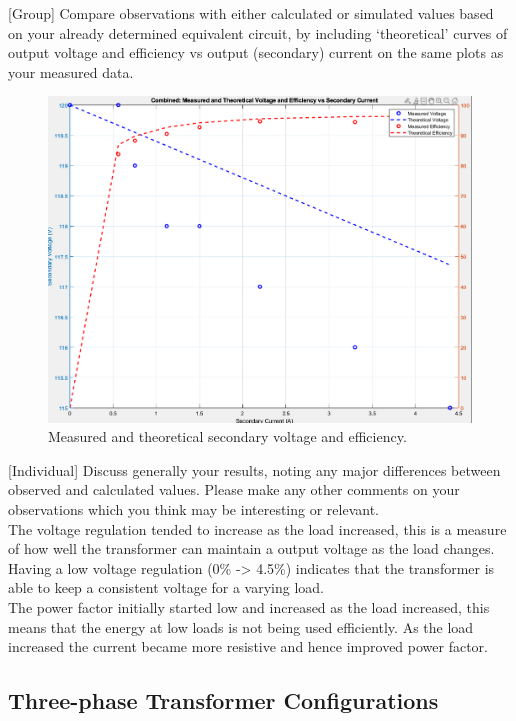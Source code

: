 \documentclass[11pt]{article}
\begin{document}
{[}Group] Compare observations with either calculated or simulated values based on your already determined equivalent circuit, by including ‘theoretical’ curves of output voltage and efficiency vs output (secondary) current on the same plots as your measured data.
\begin{FIGURE}
\begin{figure}[H]
\centering
\includegraphics[width=.9\linewidth]{Screenshot 2024-09-29 at 12-36-14 Single and 3-Phase Transformers Lab 3 Report Miley Fleming 584058.docx.png}
\caption{Measured and theoretical secondary voltage and efficiency.}
\end{figure}
\end{FIGURE}
{[}Individual] Discuss generally your results, noting any major differences between observed and calculated values. Please make any other comments on your observations which you think may be interesting or relevant. \\
The voltage regulation tended to increase as the load increased, this is a measure of how well the transformer can maintain a output voltage as the load changes. Having a low voltage regulation (0\% -> 4.5\%) indicates that the transformer is able to keep a consistent voltage for a varying load. \\
The power factor initially started low and increased as the load increased, this means that the energy at low loads is not being used efficiently. As the load increased the current became more resistive and hence improved power factor.
\subsection{Three-phase Transformer Configurations}
\label{sec:org1043558}
\end{document}
